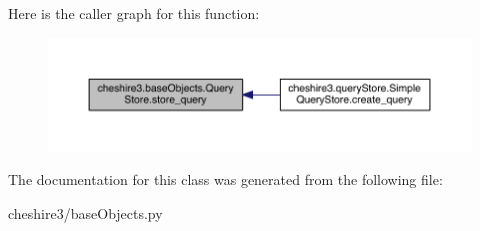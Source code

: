Here is the caller graph for this function\-:
\nopagebreak
\begin{figure}[H]
\begin{center}
\leavevmode
\includegraphics[width=350pt]{classcheshire3_1_1base_objects_1_1_query_store_a5130144a0d375624cd83ebd452ff2fac_icgraph}
\end{center}
\end{figure}




The documentation for this class was generated from the following file\-:\begin{DoxyCompactItemize}
\item 
cheshire3/base\-Objects.\-py\end{DoxyCompactItemize}
